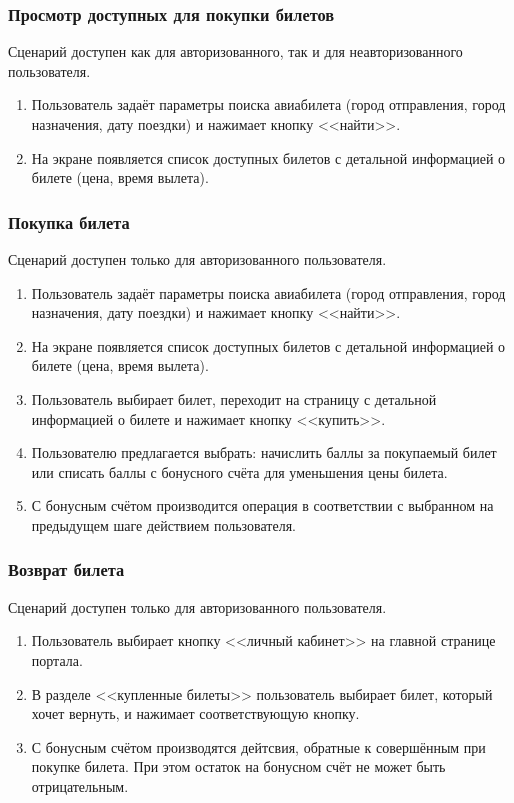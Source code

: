 \subsubsection*{Просмотр доступных для покупки билетов}
Сценарий доступен как для авторизованного, так и для неавторизованного пользователя.
\begin{enumerate}
    \item Пользователь задаёт параметры поиска авиабилета (город отправления, город назначения, дату поездки) и нажимает кнопку <<найти>>.
    \item На экране появляется список доступных билетов с детальной информацией о билете (цена, время вылета).
\end{enumerate}

\subsubsection*{Покупка билета}
Сценарий доступен только для авторизованного пользователя.
\begin{enumerate}
    \item Пользователь задаёт параметры поиска авиабилета (город отправления, город назначения, дату поездки) и нажимает кнопку <<найти>>.
    \item На экране появляется список доступных билетов с детальной информацией о билете (цена, время вылета).
    \item Пользователь выбирает билет, переходит на страницу с детальной информацией о билете и нажимает кнопку <<купить>>.
    \item Пользователю предлагается выбрать: начислить баллы за покупаемый билет или списать баллы с бонусного счёта для уменьшения цены билета.
    \item С бонусным счётом производится операция в соответствии с выбранном на предыдущем шаге действием пользователя.
\end{enumerate}

\subsubsection*{Возврат билета}
Сценарий доступен только для авторизованного пользователя.
\begin{enumerate}
    \item Пользователь выбирает кнопку <<личный кабинет>> на главной странице портала.
    \item В разделе <<купленные билеты>> пользователь выбирает билет, который хочет вернуть, и нажимает соответствующую кнопку.
    \item С бонусным счётом производятся дейтсвия, обратные к совершённым при покупке билета. При этом остаток на бонусном счёт не может быть отрицательным.
\end{enumerate}

